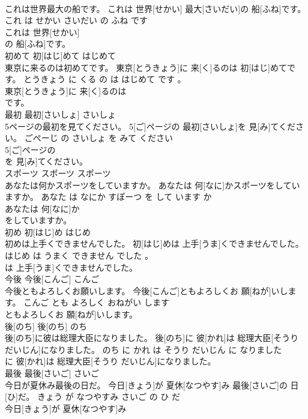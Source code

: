 \documentclass[8pt]{extreport}
\begin{document}
\begin{CJK}{UTF8}{min}
\\	これは世界最大の船です。	これは 世界[せかい] 最大[さいだい]の 船[ふね]です。	これ は せかい さいだい の ふね です	
\\	これは 世界[せかい]
\\	の 船[ふね]です。		
\\	初めて	初[はじ]めて	はじめて	
\\	東京に来るのは初めてです。	東京[とうきょう]に 来[く]るのは 初[はじ]めてです。	とうきょう に くる の は はじめて です 。	
\\	東京[とうきょう]に 来[く]るのは
\\	です。		
\\	最初	最初[さいしょ]	さいしょ	
\\	5ページの最初を見てください。	5[ご]ページの 最初[さいしょ]を 見[み]てください。	ごぺーじ の さいしょ を みて ください	
\\	5[ご]ページの
\\	を 見[み]てください。		
\\	スポーツ	スポーツ	スポーツ	
\\	あなたは何かスポーツをしていますか。	あなたは 何[なに]かスポーツをしていますか。	あなた は なにか すぽーつ を して います か	
\\	あなたは 何[なに]か
\\	をしていますか。		
\\	初め	初[はじ]め	はじめ	
\\	初めは上手くできませんでした。	初[はじ]めは 上手[うま]くできませんでした。	はじめ は うまく できません でした 。	
\\	は 上手[うま]くできませんでした。		
\\	今後	今後[こんご]	こんご	
\\	今後ともよろしくお願いします。	今後[こんご]ともよろしくお 願[ねが]いします。	こんご とも よろしく おねがい します	
\\	ともよろしくお 願[ねが]いします。		
\\	後[のち]	後[のち]	のち	
\\	後[のち]に彼は総理大臣になりました。	後[のち]に 彼[かれ]は 総理大臣[そうり だいじん]になりました。	のち に かれ は そうり だいじん に なりました	
\\	に 彼[かれ]は 総理大臣[そうり だいじん]になりました。		
\\	最後	最後[さいご]	さいご	
\\	今日が夏休み最後の日だ。	今日[きょう]が 夏休[なつやす]み 最後[さいご]の 日[ひ]だ。	きょう が なつやすみ さいご の ひ だ	
\\	今日[きょう]が 夏休[なつやす]み

\end{CJK}
\end{document}
